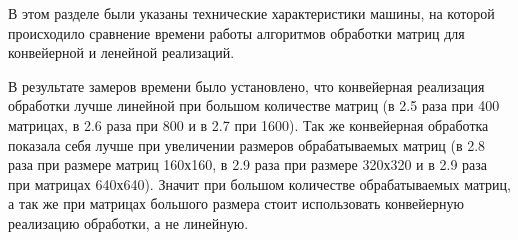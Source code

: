 В этом разделе были указаны технические характеристики машины, на которой происходило сравнение времени работы алгоритмов обработки матриц для конвейерной и ленейной реализаций.

В результате замеров времени было установлено, что конвейерная реализация обработки лучше линейной
при большом количестве матриц (в 2.5 раза при 400 матрицах, в 2.6 раза при 800 и в 2.7 при 1600). Так же конвейерная обработка показала себя лучше при увеличении размеров обрабатываемых матриц (в 2.8 раза при размере матриц 160х160, в 2.9 раза при размере 320х320 и в 2.9 раза при матрицах 640х640). Значит при большом количестве обрабатываемых матриц, а так же при матрицах большого размера стоит использовать конвейерную реализацию обработки, а не линейную.



